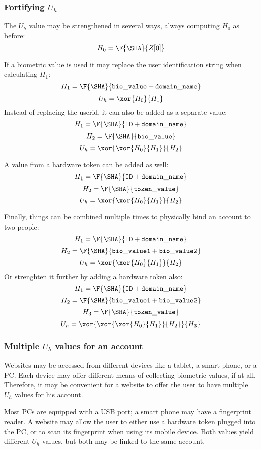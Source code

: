 \subsubsection{Fortifying $U_h$}
The $U_h$ value may be strengthened in several ways, always computing $H_0$ as before:
\[H_0=\F{\SHA}{Z[0]}\]
\par
If a biometric value is used it may replace the user identification string when calculating $H_1$:
\[H_1=\F{\SHA}{\mathtt{bio\_value+domain\_name}}\]
\[U_h=\xor{H_0}{H_1}\]
Instead of replacing the userid,
it can also be added as a separate value:
\[H_1=\F{\SHA}{\mathtt{ID+domain\_name}}\]
\[H_2=\F{\SHA}{\mathtt{bio\_value}}\]
\[U_h=\xor{\xor{H_0}{H_1}}{H_2}\]
\par
A value from a hardware token can be added as well:
\[H_1=\F{\SHA}{\mathtt{ID+domain\_name}}\]
\[H_2=\F{\SHA}{\mathtt{token\_value}}\]
\[U_h=\xor{\xor{H_0}{H_1}}{H_2}\]
\par
Finally,
things can be combined multiple times
to physically bind an account to two people:
\[H_1=\F{\SHA}{\mathtt{ID+domain\_name}}\]
\[H_2=\F{\SHA}{\mathtt{bio\_value1+bio\_value2}}\]
\[U_h=\xor{\xor{H_0}{H_1}}{H_2}\]
Or strenghten it further by adding a hardware token also:
\[H_1=\F{\SHA}{\mathtt{ID+domain\_name}}\]
\[H_2=\F{\SHA}{\mathtt{bio\_value1+bio\_value2}}\]
\[H_3=\F{\SHA}{\mathtt{token\_value}}\]
\[U_h=\xor{\xor{\xor{H_0}{H_1}}{H_2}}{H_3}\]
\subsubsection{Multiple $U_h$ values for an account}
Websites may be accessed from different devices like a tablet, a smart phone, or a PC.
Each device may offer different means of collecting biometric values, if at all.
Therefore, it may be convenient for a website to offer the user to have multiple $U_h$ values for his account.
\par
Most PCs are equipped with a USB port; a smart phone may have a fingerprint reader.
A website may allow the user to either use a hardware token plugged into the PC,
or to scan its fingerprint when using its mobile device.
Both values yield different $U_h$ values,
but both may be linked to the same account.
